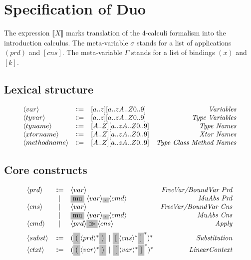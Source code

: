 \documentclass[11pt]{article}
\newcommand{\translate}[1]{\llbracket #1 \rrbracket}
\newcommand{\nonterminal}[1]{\langle #1 \rangle}
\newcommand{\terminal}[1]{\colorbox{lightgray}{#1}}
\begin{document}
\section{Specification of Duo}

The expression $\translate{X}$ marks translation of the 4-calculi formalism into the introduction calculus.
The meta-variable $\sigma$ stands for a list of applications $(prd)$ and $[cns]$.
The meta-variable $\Gamma$ stands for a list of bindings $(x)$ and $[k]$.

\subsection{Lexical structure}
\[
  \begin{array}{lclr}
    \nonterminal{var} & \Coloneqq & [a..z][a..zA..Z0..9] & \emph{Variables} \\
    \nonterminal{tyvar} & \Coloneqq & [a..z][a..zA..Z0..9] & \emph{Type Variables} \\
    \nonterminal{tyname} & \Coloneqq & [A..Z][a..zA..Z0..9] & \emph{Type Names} \\
    \nonterminal{xtorname} & \Coloneqq & [A..Z][a..zA..Z0..9] & \emph{Xtor Names} \\
    \nonterminal{methodname} & \Coloneqq & [A..Z][a..zA..Z0..9] & \emph{Type Class Method Names} \\
  \end{array}
\]

\subsection{Core constructs}
\[
  \begin{array}{lclr}
    \nonterminal{prd} & \Coloneqq & \nonterminal{var} & \emph{FreeVar/BoundVar Prd} \\
    & | & \terminal{mu}\ \nonterminal{var} \terminal{.} \nonterminal{cmd} & \textit{MuAbs Prd} \\
    \nonterminal{cns} & | & \nonterminal{var} & \textit{FreeVar/BoundVar Cns} \\
    & | & \terminal{mu}\ \nonterminal{var} \terminal{.} \nonterminal{cmd} & \textit{MuAbs Cns} \\
    \nonterminal{cmd} & | & \nonterminal{prd} \terminal{$\gg$} \nonterminal{cns} & \textit{Apply} \\[0.2cm]
    \nonterminal{subst} & \Coloneqq & (\terminal{(}\nonterminal{prd}^{\ast}\terminal{)}\ |\ \terminal{[}\nonterminal{cns}^{\ast}\terminal{]}^{\ast})^{\ast} & \emph{Substitution} \\
    \nonterminal{ctxt} & \Coloneqq & (\terminal{(}\nonterminal{var}^{\ast}\terminal{)}\ |\ \terminal{[}\nonterminal{var}^{\ast}\terminal{]}^{\ast})^{\ast} & \emph{LinearContext}
  \end{array}
\]
\end{document}
